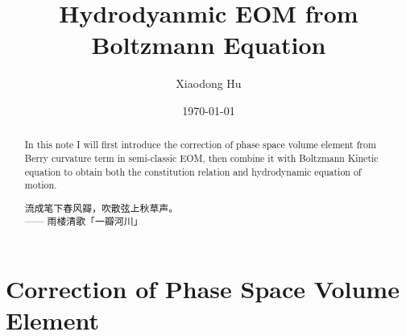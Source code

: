 \documentclass[10pt,nofootinbib,letterpaper]{revtex4}
\begin{document}
\title{Hydrodyanmic EOM from Boltzmann Equation}
\author{Xiaodong Hu}

\date{\today}

\begin{abstract}
	In this note I will first introduce the correction of phase space volume element from Berry curvature term in semi-classic EOM, then combine it with Boltzmann Kinetic equation to obtain both the constitution relation and hydrodynamic equation of motion.\par
		\hfill\par
		{\centering\kaishu 流成笔下春风瓣，吹散弦上秋草声。\\[0.5em]}
	\hfill------ 雨楼清歌「一瓣河川」
\end{abstract}

\maketitle
\tableofcontents

\section{Correction of Phase Space Volume Element}
\end{document}
